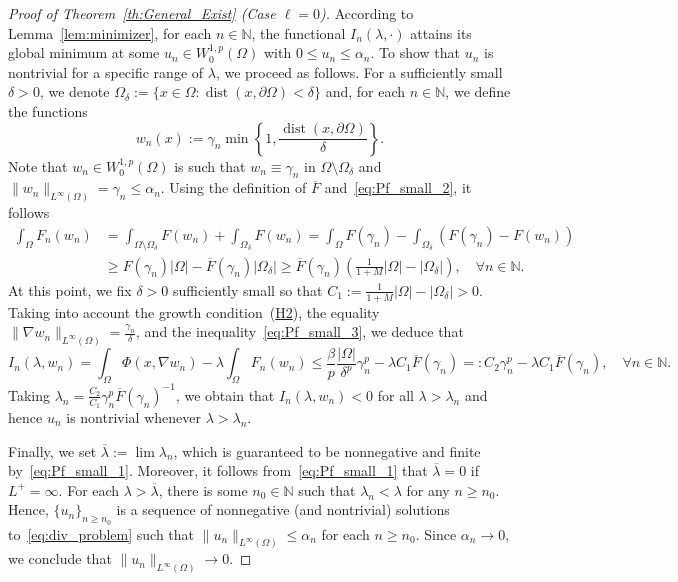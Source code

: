 \documentclass[10pt,twoside,english,reqno,a4paper]{amsart}
\theoremstyle{plain}
\theoremstyle{plain}
\theoremstyle{definition}
\theoremstyle{remark}
\numberwithin{equation}{section}
\newcommand{\na}{\mathbb{N}}
\newcommand{\N}{\mathbb{N}}
\def\sob{W^{1,p}_{0}(\Omega)}
\def\lio{{L^{\infty}(\Omega)}}
\def\into{\int_{\Omega}}
\newcommand{\oF}{\overline{F}}
\newcommand{\oL}{L^+}
\begin{document}
\begin{proof}[Proof of Theorem~\ref{th:General_Exist} (Case $\ell=0$)]
According to Lemma~\ref{lem:minimizer}, for each $n \in \N$, the functional $I_n(\lambda, \cdot)$ attains its global minimum at some $u_n \in \sob$ with $0 \leq u_n \leq \alpha_n$. To show that $u_n$ is nontrivial for a specific range of $\lambda$, we proceed as follows. For a sufficiently small $\delta > 0$, we denote $\Omega_{\delta} := \{ x \in \Omega : \operatorname{dist}(x, \partial \Omega) < \delta \}$ and, for each $n\in\N$, we define the functions
\begin{equation}
\label{eq:Pf_small_2bis}
w_{n}(x) := \gamma_n \min \left\{ 1, \frac{\operatorname{dist}(x, \partial \Omega)}{\delta} \right\}.
\end{equation}
Note that $w_n\in W_0^{1,p}(\Omega)$ is such that $w_n\equiv \gamma_n$ in $\Omega\setminus\Omega_\delta$ and $\|w_n\|_\lio=\gamma_n \leq \alpha_n$. Using the definition of $\oF$ and~\eqref{eq:Pf_small_2}, it follows
\begin{equation}
\label{eq:Pf_small_3}
\begin{split}
\int_{\Omega} F_n (w_n) &=
\int_{\Omega \setminus \Omega_{\delta}} F (w_n) +
\int_{\Omega_{\delta}} F(w_n) =
\int_{\Omega} F(\gamma_n) - \int_{\Omega_\delta} \left( F(\gamma_n)  - F(w_n) \right)
\\
&\geq F(\gamma_n) |\Omega| - \oF(\gamma_n) |\Omega_\delta| \geq \oF(\gamma_n) \left(\frac{1}{1+M} |\Omega| -|\Omega_\delta| \right),\quad \forall n\in\na.
\end{split}
\end{equation}
At this point, we fix $\delta>0$ sufficiently small so that $C_1:= \frac{1}{1+M} |\Omega| -|\Omega_\delta| > 0$. Taking into account the growth condition~(\hyperlink{hyp:growth}{H2}), the equality $\|\nabla w_n\|_{L^\infty(\Omega)} = \frac{\gamma_n}{\delta}$, and the inequality~\eqref{eq:Pf_small_3}, we deduce that
\[
I_n(\lambda,w_n) = \into \Phi(x,\nabla w_n) - \lambda \int_{\Omega} F_n (w_n) \leq \frac{\beta}{p} \frac{|\Omega|}{\delta^p} \gamma_n^p -\lambda C_1 \oF(\gamma_n) =: C_2 \gamma_n^p - \lambda C_1 \oF(\gamma_n),\quad \forall n\in\N.
\]
Taking $\lambda_n = \frac{C_2}{C_1} \gamma_n^p\oF(\gamma_n)^{-1}$, we obtain that $I_n(\lambda, w_n) < 0$ for all $\lambda > \lambda_n$ and hence $u_n$ is nontrivial whenever $\lambda > \lambda_n$.

Finally, we set $\overline{\lambda} := \lim \lambda_n$, which is guaranteed to be nonnegative and finite by~\eqref{eq:Pf_small_1}. Moreover, it follows from~\eqref{eq:Pf_small_1} that $\overline{\lambda}=0$ if $\oL=\infty$. For each $\lambda > \overline{\lambda}$, there is some $n_0\in\N$ such that $\lambda_n<\lambda$ for any $n\geq n_0$. Hence, $\{u_n\}_{n\geq n_0}$ is a sequence of nonnegative (and nontrivial) solutions to~\eqref{eq:div_problem} such that $\|u_n\|_\lio \leq \alpha_n$ for each $n\geq n_0$. Since $\alpha_n\to 0$, we conclude that $\|u_n\|_\lio \to 0$.
\end{proof}
\end{document}
